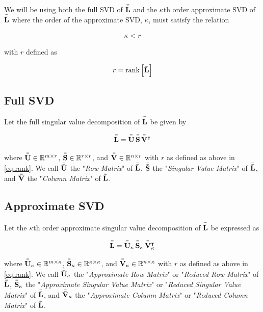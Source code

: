 \documentclass[../../ClusteringConnectionsMAIN.tex]{subfiles}
\begin{document}
\begin{flushleft}
\begin{large}

We will be using both the full SVD of $\bar{\bar{\mathbf{L}}}$ and the $\kappa$th order approximate SVD of $\bar{\bar{\mathbf{L}}}$ where the order of the approximate SVD, $\kappa$, must satisfy the relation

\begin{align*}
\kappa < r
\end{align*} 

with $r$ defined as

\begin{align} 
r = \text{rank} \left[ \bar{\bar{\mathbf{L}}} \right] \label{eq:rank}
\end{align}


\subsection{Full SVD}

Let the full singular value decomposition of $\bar{\bar{\mathbf{L}}}$ be given by

\begin{align*}
\bar{\bar{\mathbf{L}}} = \bar{\bar{\mathbf{U}}} \, \bar{\bar{\mathbf{S}}} \, \bar{\bar{\mathbf{V}}}^\intercal
\end{align*}

where $\bar{\bar{\mathbf{U}}} \in \mathbb{R}^{m \times r}$, $\bar{\bar{\mathbf{S}}} \in \mathbb{R}^{r \times r}$, and $\bar{\bar{\mathbf{V}}} \in \mathbb{R}^{n \times r}$ with $r$ as defined as above in \ref{eq:rank}.  We call $\bar{\bar{\mathbf{U}}}$ the "\emph{Row Matrix}" of $\bar{\bar{\mathbf{L}}}$, $\bar{\bar{\mathbf{S}}}$ the "\emph{Singular Value Matrix}" of $\bar{\bar{\mathbf{L}}}$, and $\bar{\bar{\mathbf{V}}}$ the "\emph{Column Matrix}" of $\bar{\bar{\mathbf{L}}}$.


\subsection{Approximate SVD}

Let the $\kappa$th order approximate singular value decomposition of $\bar{\bar{\mathbf{L}}}$ be expressed as

\begin{align*}
\bar{\bar{\mathbf{L}}} = \bar{\bar{\mathbf{U}}}_\kappa \, \bar{\bar{\mathbf{S}}}_\kappa \, \bar{\bar{\mathbf{V}}}_\kappa^\intercal
\end{align*}

where $\bar{\bar{\mathbf{U}}}_\kappa \in \mathbb{R}^{m \times \kappa}$, $\bar{\bar{\mathbf{S}}}_\kappa \in \mathbb{R}^{\kappa \times \kappa}$, and $\bar{\bar{\mathbf{V}}}_\kappa \in \mathbb{R}^{n \times \kappa}$ with $r$ as defined as above in \ref{eq:rank}.  We call $\bar{\bar{\mathbf{U}}}_\kappa$ the "\emph{Approximate Row Matrix}" or "\emph{Reduced Row Matrix}" of $\bar{\bar{\mathbf{L}}}$, $\bar{\bar{\mathbf{S}}}_\kappa$ the "\emph{Approximate Singular Value Matrix}" or "\emph{Reduced Singular Value Matrix}" of $\bar{\bar{\mathbf{L}}}$, and $\bar{\bar{\mathbf{V}}}_\kappa$ the "\emph{Approximate Column Matrix}" or "\emph{Reduced Column Matrix}" of $\bar{\bar{\mathbf{L}}}$.


\end{large}
\end{flushleft}
\end{document}
